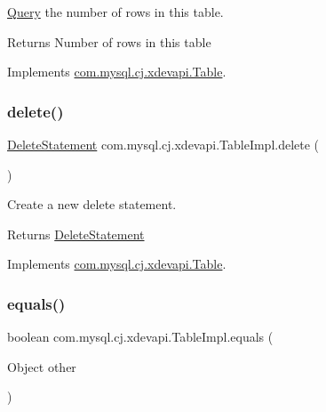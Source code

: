 \mbox{\hyperlink{interfacecom_1_1mysql_1_1cj_1_1_query}{Query}} the number of rows in this table.

\begin{DoxyReturn}{Returns}
Number of rows in this table 
\end{DoxyReturn}


Implements \mbox{\hyperlink{interfacecom_1_1mysql_1_1cj_1_1xdevapi_1_1_table_a4f0524bd76d54d6b053187ea09ab2956}{com.\+mysql.\+cj.\+xdevapi.\+Table}}.

\mbox{\label{classcom_1_1mysql_1_1cj_1_1xdevapi_1_1_table_impl_ab12665d608984e6774957947f6a22c7c}} 
\subsubsection{\texorpdfstring{delete()}{delete()}}
{\footnotesize\ttfamily \mbox{\hyperlink{interfacecom_1_1mysql_1_1cj_1_1xdevapi_1_1_delete_statement}{Delete\+Statement}} com.\+mysql.\+cj.\+xdevapi.\+Table\+Impl.\+delete (\begin{DoxyParamCaption}{ }\end{DoxyParamCaption})}

Create a new delete statement.

\begin{DoxyReturn}{Returns}
\mbox{\hyperlink{interfacecom_1_1mysql_1_1cj_1_1xdevapi_1_1_delete_statement}{Delete\+Statement}} 
\end{DoxyReturn}


Implements \mbox{\hyperlink{interfacecom_1_1mysql_1_1cj_1_1xdevapi_1_1_table_a52be4284a88e0a4f243580be570018e2}{com.\+mysql.\+cj.\+xdevapi.\+Table}}.

\mbox{\label{classcom_1_1mysql_1_1cj_1_1xdevapi_1_1_table_impl_a0f66e0bb59cb1537222b61858537daa3}} 
\subsubsection{\texorpdfstring{equals()}{equals()}}
{\footnotesize\ttfamily boolean com.\+mysql.\+cj.\+xdevapi.\+Table\+Impl.\+equals (\begin{DoxyParamCaption}\item[{Object}]{other }\end{DoxyParamCaption})}

